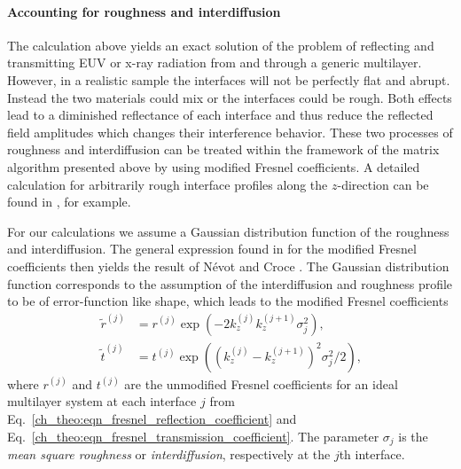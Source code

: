 \paragraph{Accounting for roughness and interdiffusion}
The calculation above yields an exact solution of the problem of reflecting and transmitting EUV or x-ray radiation from and through a generic multilayer. However, in a realistic sample the interfaces will not be perfectly flat and abrupt. Instead the two materials could mix or the interfaces could be rough. Both effects lead to a diminished reflectance of each interface and thus reduce the reflected field amplitudes which changes their interference behavior. These two processes of roughness and interdiffusion can be treated within the framework of the matrix algorithm presented above by using modified Fresnel coefficients. A detailed calculation for arbitrarily rough interface profiles along the $z$-direction can be found in \cite{vidal_metallic_1984}, for example.

For our calculations we assume a Gaussian distribution function of the roughness and interdiffusion. The general expression found in \cite{vidal_metallic_1984} for the modified Fresnel coefficients then yields the result of N\'{e}vot and Croce \cite{croce_p._etude_1976, nevot_l._caracterisation_1980}. The Gaussian distribution function corresponds to the assumption of the interdiffusion and roughness profile to be of error-function like shape, which leads to the modified Fresnel coefficients
\begin{align}
       \tilde{r}^{(j)} &= r^{(j)} \exp(-2 k_z^{(j)} k_z^{(j+1)} 
\sigma_j^2)\text{,} \nonumber \\
       \tilde{t}^{(j)} &= t^{(j)} \exp((k_z^{(j)} - k_z^{(j+1)})^2 \sigma_j^2/2) 
\text{,} \label{eqn:mod_fresnel}
\end{align}
where $r^{(j)}$ and $t^{(j)}$ are the unmodified Fresnel coefficients for an ideal multilayer system at each interface $j$ from Eq.~\eqref{ch_theo:eqn_fresnel_reflection_coefficient} and Eq.~\eqref{ch_theo:eqn_fresnel_transmission_coefficient}. The parameter $\sigma_j$ is the \emph{mean square roughness} or \emph{interdiffusion}, respectively at the $j$th interface.

